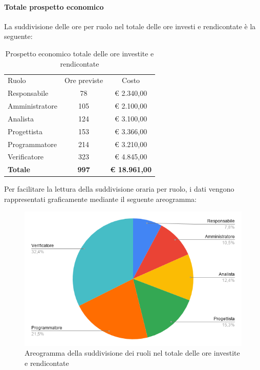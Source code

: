 \documentclass[../piano-di-progetto.tex]{subfiles}
\begin{document}
    \paragraph{Totale prospetto economico}
    La suddivisione delle ore per ruolo nel totale delle ore investi e rendicontate è la seguente:
    \begin{table}[H]
      \centering
      \begin{tabular}{lcc}
        Ruolo           & Ore previste & Costo                \\
        Responsabile    & 78           & € 2.340,00           \\
        Amministratore  & 105          & € 2.100,00           \\
        Analista        & 124          & € 3.100,00           \\
        Progettista     & 153          & € 3.366,00           \\
        Programmatore   & 214          & € 3.210,00           \\
        Verificatore    & 323          & € 4.845,00           \\
        \textbf{Totale} & \textbf{997} & \textbf{€ 18.961,00}
      \end{tabular}
      \caption{Prospetto economico totale delle ore investite e rendicontate}
    \end{table}

    Per facilitare la lettura della suddivisione oraria per ruolo, i dati vengono rappresentati graficamente mediante il seguente areogramma:
    \begin{figure}[H]
      \centering
      \includegraphics[width=12cm]{img/ruoli-totale.png}
      \caption{Areogramma della suddivisione dei ruoli nel totale delle ore investite e rendicontate}
      \label{fig:ore-totali}
    \end{figure}
\end{document}
